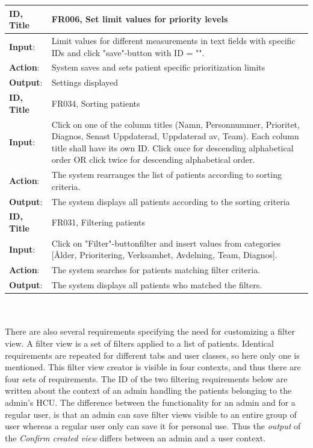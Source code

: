 \documentclass{article}
\begin{document}
\begin{tabularx}{\linewidth}{| l |  X |}
\hline
\textbf{ID, Title} & FR006, Set limit values for priority levels  \\ 
\hline
\textbf{Input}: & Limit values for different measurements in text fields with specific IDs and click "save"-button with ID = "".\\
\textbf{Action}: & System saves and sets patient specific prioritization limits \\
\textbf{Output}: & Settings displayed \\
\hline

\textbf{ID, Title} & FR034, Sorting patients  \\ 
\hline
\textbf{Input}: & Click on one of the column titles (Namn, Personnummer, Prioritet, Diagnos, Senast Uppdaterad, Uppdaterad av, Team). Each column title shall have its own ID. Click once for descending alphabetical order OR click twice for descending alphabetical order.  \\
\textbf{Action}: & The system rearranges the list of patients according to sorting criteria. \\
\textbf{Output}: & The system displays all patients according to the sorting criteria\\ 
\hline

 \textbf{ID, Title} & FR031, Filtering patients  \\ 
 \hline
 \textbf{Input}: &  Click on "Filter"-buttonfilter and insert values from categories [Ålder, Prioritering, Verksamhet, Avdelning, Team, Diagnos]. \\
\textbf{Action}: & The system searches for patients matching filter criteria. \\
\textbf{Output}: & The system displays all patients who matched the filters.\\
\hline
\end{tabularx}
\\ \\
There are also several requirements specifying the need for customizing a filter view. A filter view is a set of filters applied to a list of patients. Identical requirements are repeated for different tabs and user classes, so here only one is mentioned. This filter view creator is visible in four contexts, and thus there are four sets of requirements. The ID of the two filtering requirements below are written about the context of an admin handling the patients belonging to the admin's HCU. The difference between the functionality for an admin and for a regular user, is that an admin can save filter views visible to an entire group of user whereas a regular user only can save it for personal use. Thus the \emph{output} of the \emph{Confirm created view} differs between an admin and a user context.
\end{document}
